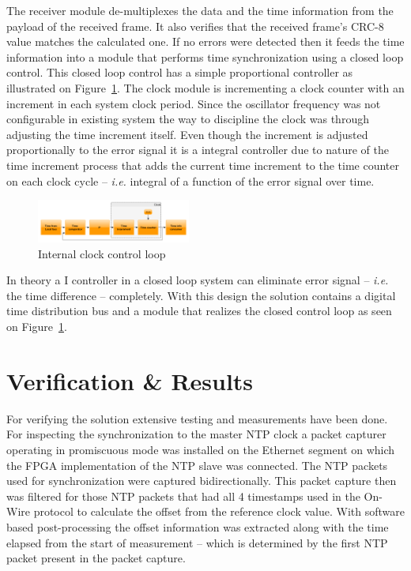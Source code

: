 \documentclass[article]{IEEEtran}
\begin{document}
The receiver module de-multiplexes the data and the time information from the payload of the received frame. It also 
verifies that the received frame's CRC-8 value matches the calculated one. If no errors were detected then it feeds the 
time information into a module that performs time synchronization using a closed loop control.
This closed loop control has a simple proportional controller as illustrated on Figure~\ref{fig:closed-loop}. The clock module
is incrementing a clock counter with an increment in each system clock period. Since the oscillator frequency was not configurable in 
existing system the way to discipline the clock was through adjusting the time increment itself.
Even though the increment is adjusted proportionally to the error signal it is a integral controller due to nature of 
the time increment process that adds the current time increment to the time counter on each clock cycle 
-- \emph{i.e.} integral of a function of the error signal over time.

\begin{figure}[H]
    \centering
    \includegraphics[width=0.45\textwidth]{figures_raw/time_control_loop.png}
    \caption{Internal clock control loop}
    \label{fig:closed-loop}
\end{figure}

In theory a I controller in a closed loop system can eliminate error signal -- \emph{i.e.} the time difference -- completely.
With this design the solution contains a digital time distribution bus and a module that realizes the 
closed control loop as seen on Figure~\ref{fig:closed-loop}.

\section{Verification \& Results}


For verifying the solution extensive testing and measurements have been done. For inspecting the synchronization 
to the master NTP clock a packet capturer operating in promiscuous mode was installed on the Ethernet segment on which the FPGA implementation
of the NTP slave was connected. The NTP packets used for synchronization were captured bidirectionally. This packet
capture then was filtered for those NTP packets that had all 4 timestamps used in the On-Wire protocol to calculate the 
offset from the reference clock value. With software based post-processing the offset information was extracted along with the time elapsed from 
the start of measurement -- which is determined by the first NTP packet present in the packet capture.
\end{document}
